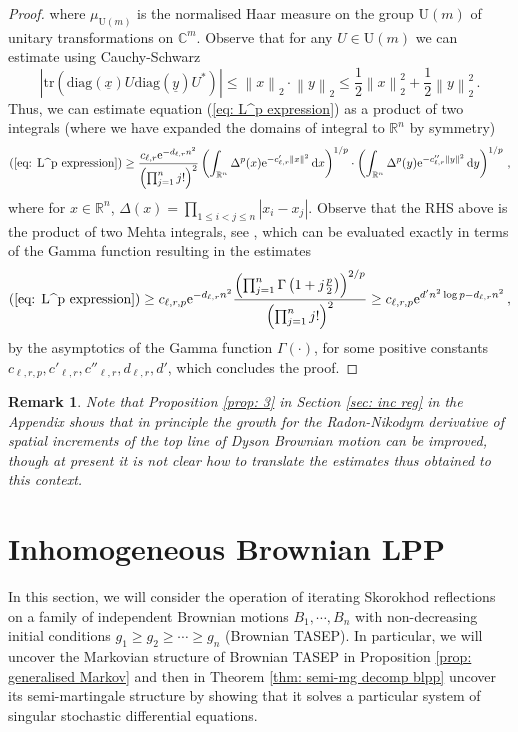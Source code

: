 \documentclass[11pt, reqno]{amsart}
\numberwithin{equation}{section}
\newtheorem*{remark}{Remark}
\newcommand{\R}{\ensuremath{\mathbb{R}}}
\newcommand{\C}{\ensuremath{\mathbb{C}}}
\newcommand{\norm}[1]{\left\lVert#1\right\rVert}
\newcommand{\diff}{\ensuremath{\operatorname{d}\!}}
\begin{document}
\begin{proof}
where $\mu_{\mathrm{U}(m)}$ is the normalised Haar measure on the group $\mathrm{U}(m)$ of unitary transformations on $\C^m$. Observe that for any $U\in \mathrm{U}(m)$ we can estimate using Cauchy-Schwarz
 \begin{equation*}
     |\mathrm{tr}(\mathrm{diag}(\underline{x})U\mathrm{diag}(\underline{y})U^*)|\le \norm{x}_2\cdot\norm{y}_2\le \frac{1}{2}\norm{x}_2^2+ \frac{1}{2}\norm{y}_2^2\,.
 \end{equation*}
 Thus, we can estimate equation (\ref{eq: L^p expression}) as a product of two integrals (where we have expanded the domains of integral to $\R^n$ by symmetry)
 \[
(\ref{eq: L^p expression}) \ge \frac{c_{\ell,r} \mathrm{e}^{-d_{\ell,r} n^2}}{\left(\prod_{j=1}^{n}j!\right)^2} \left(\displaystyle\int_{\R^n} \Delta^p(x)\mathrm{e}^{-c'_{\ell,r}\norm{x}^2}\diff x\right)^{1/p}\cdot \left(\displaystyle\int_{\R^n} \Delta^p(y)\mathrm{e}^{-c''_{\ell,r}\norm{y}^2}\diff y\right)^{1/p}\,,
\]
where for $x\in \R^n$, $\Delta(x) = \prod_{1\le i < j\le n}|x_i-x_j|$. Observe that the RHS above is the product of two Mehta integrals, see \cite[Eq. (1.1)]{forrester2008importance}, which can be evaluated exactly in terms of the Gamma function resulting in the estimates
\[
(\ref{eq: L^p expression}) \ge c_{\ell,r, p} \mathrm{e}^{-d_{\ell,r} n^2}\frac{\left(\prod_{j=1}^{n}\Gamma\left(1+j\frac{p}{2}\right)\right)^{2/p}}{\left(\prod_{j=1}^{n}j!\right)^2}\ge c_{\ell,r, p} \mathrm{e}^{d'n^2\log p -d_{\ell,r} n^2}\,,
\]
by the asymptotics of the Gamma function $\Gamma(\cdot)$, for some positive constants $c_{\ell,r, p}, c'_{\ell,r}, c''_{\ell,r},  d_{\ell,r}, d'$, which concludes the proof.
\end{proof}

\begin{remark}
    Note that Proposition \ref{prop: 3} in Section \ref{sec: inc reg} in the Appendix shows that in principle the growth for the Radon-Nikodym derivative of spatial increments of the top line of Dyson Brownian motion can be improved, though at present it is not clear how to translate the estimates thus obtained to this context.
\end{remark}

\section{Inhomogeneous Brownian LPP}\label{sec: inhom blpp}
In this section, we will consider the operation of iterating Skorokhod reflections on a family of independent Brownian motions $B_1, \cdots, B_n$ with non-decreasing initial conditions $g_1 \ge g_2 \ge \cdots \ge g_n$ (Brownian TASEP). In particular, we will uncover the Markovian structure of Brownian TASEP in Proposition \ref{prop: generalised Markov} and then in Theorem \ref{thm: semi-mg decomp blpp} uncover its semi-martingale structure by showing that it solves a particular system of singular stochastic differential equations.
\end{document}

